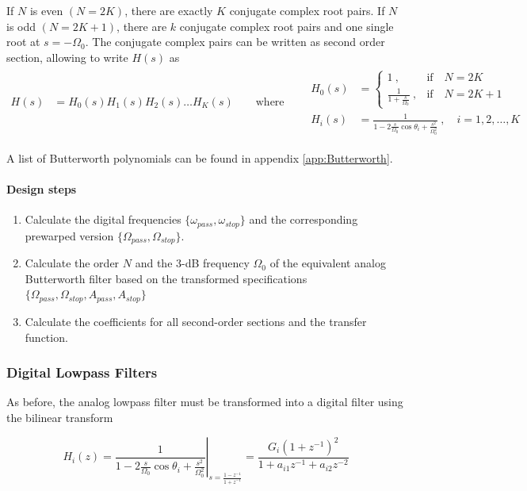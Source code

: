 If $N$ is even $(N = 2K)$, there are exactly $K$ conjugate complex root pairs.
If $N$ is odd $(N = 2K+1)$, there are $k$ conjugate complex root pairs and one
single root at $s = -\Omega_0$. The conjugate complex pairs can be written as
second order section, allowing to write $H(s)$ as \\

\begin{align*}
	H(s) &= H_0(s) H_1(s) H_2(s) \ldots H_K(s) \qquad \text{where} \qquad
	\begin{array}{ll}
		H_0(s) & = \begin{cases}
			1\:, & \text{if} \quad N = 2K \\
			\frac{1}{1 + \frac{s}{\Omega_0}} \:, & \text{if} \quad N = 2K+1
			\end{cases} \\
		H_i(s) &= \frac{1}{1 - 2 \frac{s}{\Omega_0} \cos\theta_i + \frac{s^2}{\Omega_0^2}} \:,\quad i=1,2,\ldots,K
	\end{array}
\end{align*}

A list of Butterworth polynomials can be found in appendix \ref{app:Butterworth}.

\paragraph{Design steps}
\begin{enumerate}
	\item Calculate the digital frequencies $\{\omega_{pass}, \omega_{stop}\}$
	and the corresponding prewarped version $\{\Omega_{pass}, \Omega_{stop}\}$.
	\item Calculate the order $N$ and the 3-dB frequency $\Omega_0$ of the
	 equivalent analog Butterworth filter based on the transformed specifications
	 $\{\Omega_{pass}, \Omega_{stop}, A_{pass}, A_{stop} \}$
	\item Calculate the coefficients for all second-order sections and the transfer function.
\end{enumerate}

\subsubsection{Digital Lowpass Filters}
As before, the analog lowpass filter must be transformed into a digital
filter using the bilinear transform

\begin{equation*}
	H_i(z) = \left.\frac{1}{1 - 2 \frac{s}{\Omega_0}\cos\theta_i + \frac{s^2}{\Omega_0^2}}\right|_{s = \frac{1-z^{-1}}{1+z^{-1}}} =
	\frac{G_i (1+z^{-1})^2}{1 + a_{i1}z^{-1} + a_{i2}z^{-2}}
\end{equation*}

